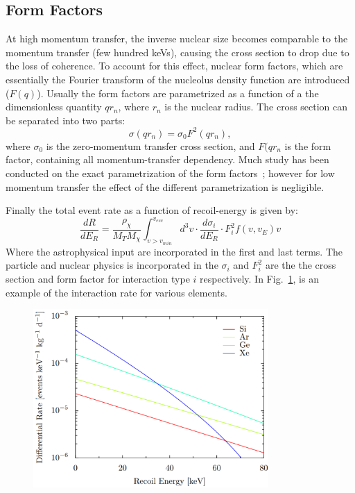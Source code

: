 \subsection{Form Factors}

At high momentum transfer, the inverse nuclear size becomes comparable to the momentum transfer (few hundred keVs), causing the cross section to drop due to the loss of coherence. To account for this effect, nuclear form factors, which are essentially the Fourier transform of the nucleolus density function are introduced ($F(q)$). Usually the form factors are parametrized as a function of a the dimensionless quantity $qr_n$, where $r_n$ is the nuclear radius. The cross section can be separated into two parts:
\begin{equation}
\sigma(qr_n) = \sigma_0F^2(qr_n),
\end{equation}
where $\sigma_0$ is the zero-momentum transfer cross section, and $F(qr_n$ is the form factor, containing all momentum-transfer dependency. Much study has been conducted on the exact parametrization of the form factors~\cite{Feldstein:2009tr}; however for low momentum transfer the effect of the different parametrization is negligible. 

Finally the total event rate as a function of recoil-energy is given by:
\begin{equation}
\frac{dR}{dE_R} = \frac{\rho_\chi}{M_TM_\chi}\int_{v>v_{min}}^{v_{esc}}d^3v\cdot \frac{d\sigma_i}{dE_R}\cdot F_i^2f(v,v_E)v
\end{equation} 
Where the astrophysical input are incorporated in the first and last terms. The particle and nuclear physics is incorporated in the $\sigma_i$ and $F^2_i$ are the the cross section and form factor for interaction type $i$ respectively. In Fig.~\ref{fig:interactionRate}, is an example of the interaction rate for various elements.

\begin{figure}[t!]
	\centering
	\includegraphics[width=0.8\textwidth]{figs/EventRate.png}
	\label{fig:interactionRate}
\end{figure}

